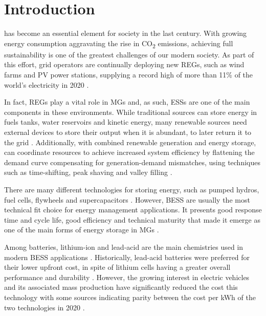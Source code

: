 \documentclass{ieeeaccess}
\begin{document}
    \maketitle

    \section{Introduction}
    \label{sec:introduction}
         has become an essential element for society in the last century. With growing energy consumption aggravating the rise in CO\textsubscript{2} emissions, achieving full sustainability is one of the greatest challenges of our modern society. As part of this effort, grid operators are continually deploying new \acp{REG}, such as wind farms and \ac{PV} power stations, supplying a record high of more than 11\% of the world's electricity in 2020 \cite{EMBER2021}.

        In fact, \acp{REG} play a vital role in \acp{MG} and, as such, \acp{ESS} are one of the main components in these environments. While traditional sources can store energy in fuels tanks, water reservoirs and kinetic energy, many renewable sources need external devices to store their output when it is abundant, to later return it to the grid \cite{STECCA2020}. Additionally, with combined renewable generation and energy storage,  can coordinate resources to achieve increased system efficiency by flattening the demand curve compensating for generation-demand mismatches, using techniques such as time-shifting, peak shaving and valley filling \cite{WANG20196201, LI2020106058, PARRA2015576, ZHANG2019772}.

        There are many different technologies for storing energy, such as pumped hydros, fuel cells, flywheels and supercapacitors \cite{IBRAHIM2008}. However, \ac{BESS} are usually the most technical fit choice for energy management applications. It presents good response time and cycle life, good efficiency and technical maturity that made it emerge as one of the main forms of energy storage in \acp{MG} \cite{KOCER2019, martins2018optimal, FU20136749070}.

        Among batteries, lithium-ion and lead-acid are the main chemistries used in modern \ac{BESS} applications \cite{FU20136749070, ALSAIDAN8094981}. Historically, lead-acid batteries were preferred for their lower upfront cost, in spite of lithium cells having a greater overall performance and durability \cite{wang2013li, xu2010lithium}. However, the growing interest in electric vehicles and its associated mass production have significantly reduced the cost this technology with some sources indicating parity between the cost per kWh of the two technologies in 2020 \cite{mongird20202020, BBERG2020}.
\end{document}
